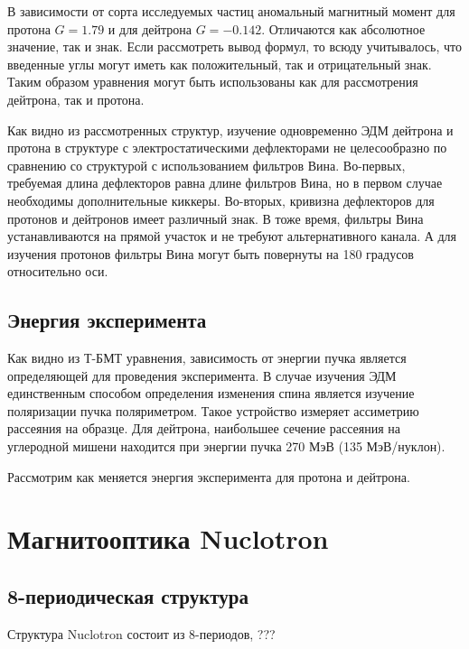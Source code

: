 \par В зависимости от сорта исследуемых частиц аномальный магнитный момент для протона $G=1.79$ и для дейтрона $G=-0.142$. Отличаются как абсолютное значение, так и знак. Если рассмотреть вывод формул, то всюду учитывалось, что введенные углы могут иметь как положительный, так и отрицательный знак. Таким образом уравнения могут быть использованы как для рассмотрения дейтрона, так и протона. 

\par  Как видно из рассмотренных структур, изучение одновременно ЭДМ дейтрона и протона в структуре с электростатическими дефлекторами не целесообразно по сравнению со структурой с использованием фильтров Вина. Во-первых, требуемая длина дефлекторов равна длине фильтров Вина, но в первом случае необходимы дополнительные киккеры. Во-вторых, кривизна дефлекторов для протонов и дейтронов имеет различный знак. В тоже время, фильтры Вина устанавливаются на прямой участок и не требуют альтернативного канала. А для изучения протонов фильтры Вина могут быть повернуты на 180 градусов относительно оси.

	\subsection{Энергия эксперимента}\label{sec:EDM/requirements/energy}
\par Как видно из Т-БМТ уравнения, зависимость от энергии пучка является определяющей для проведения эксперимента. В случае изучения ЭДМ единственным способом определения изменения спина является изучение поляризации пучка поляриметром. Такое устройство измеряет ассиметрию рассеяния на образце. Для дейтрона, наибольшее сечение рассеяния на углеродной мишени находится при энергии пучка 270 МэВ (135 МэВ/нуклон).

\par Рассмотрим как меняется энергия эксперимента для протона и дейтрона. 
	
	\section{Магнитооптика Nuclotron}\label{sec:EDM/optics}
	\subsection{8-периодическая структура}\label{sec:EDM/optics/8period}
\par Структура Nuclotron состоит из 8-периодов, ???

